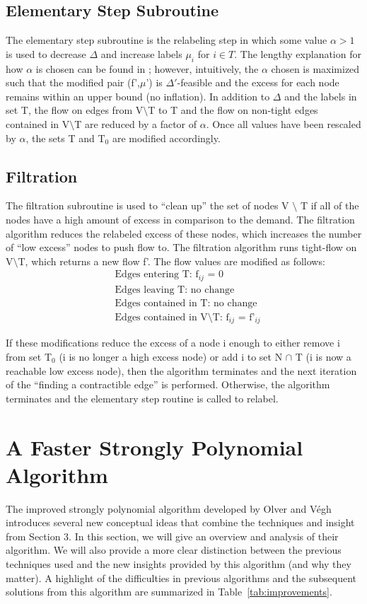 \documentclass[11pt]{article}
\theoremstyle{definition}
\theoremstyle{definition}
\begin{document}
	\subsection{Elementary Step Subroutine}
	The elementary step subroutine is the relabeling step in which some value $\alpha > 1$ is used to decrease $\Delta$ and increase labels $\mu_i$ for $i \in T$. The lengthy explanation for how $\alpha$ is chosen can be found in \cite{article}; however, intuitively, the $\alpha$ chosen is maximized such that the modified pair (f',$\mu$') is $\Delta'$-feasible and the excess for each node remains within an upper bound (no inflation). In addition to $\Delta$ and the labels in set T, the flow on edges from V$\setminus$T to T and the flow on non-tight edges contained in V$\setminus$T are reduced by a factor of $\alpha$. Once all values have been rescaled by $\alpha$, the sets T and T$_0$ are modified accordingly.  
	
	\subsection{Filtration}
	The filtration subroutine is used to ``clean up'' the set of nodes V $\setminus$ T if all of the nodes have a high amount of excess in comparison to the demand. The filtration algorithm reduces the relabeled excess of these nodes, which increases the number of ``low excess'' nodes to push flow to. The filtration algorithm runs tight-flow on V$\setminus$T, which returns a new flow f'. The flow values are modified as follows: 
	\begin{align*}
	&\text{Edges entering T: f$_{ij}$ = 0} \\ 
	&\text{Edges leaving T: no change} \\
	&\text{Edges contained in T: no change} \\
	&\text{Edges contained in V$\setminus$T: f$_{ij}$ = f'$_{ij}$}
	\end{align*}
	
	If these modifications reduce the excess of a node i enough to either remove i from set T$_0$ (i is no longer a high excess node) or add i to set N $\cap$ T (i is now a reachable low excess node), then the algorithm terminates and the next iteration of the ``finding a contractible edge'' is performed. Otherwise, the algorithm terminates and the elementary step routine is called to relabel.

\section{A Faster Strongly Polynomial Algorithm}
The improved strongly polynomial algorithm developed by Olver and Végh \cite{Olver2017}
introduces several new conceptual ideas that combine the techniques and insight from Section 3.
In this section, we will give an overview and analysis of their algorithm. We will also
provide a more clear distinction between the previous techniques used and the new insights
provided by this algorithm (and why they matter). A highlight of the difficulties in
previous algorithms and the subsequent solutions from this algorithm are
summarized in Table~\ref{tab:improvements}.
\end{document}

